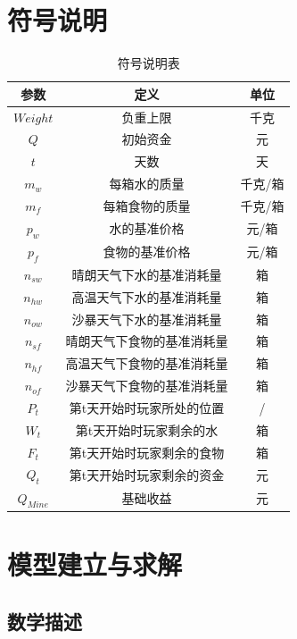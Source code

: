 \documentclass[withoutpreface,bwprint]{cumcmthesis} %
\begin{document}
\section{符号说明}
\begin{table}[H]
    \caption{符号说明表}\label{tab:001} \centering
    \begin{tabular}{ccc}
        \toprule[1.5pt]
        \textbf{参数} & \textbf{定义} & \textbf{单位}\\
        \midrule[1pt]
        $Weight$ & 负重上限 & 千克\\ 
        $Q$ & 初始资金 & 元 \\
        $t$ & 天数 & 天\\
        $m_w$ & 每箱水的质量 & 千克/箱\\
        $m_f$ & 每箱食物的质量 & 千克/箱 \\
        $p_w$ & 水的基准价格 & 元/箱\\
        $p_f$ & 食物的基准价格 & 元/箱\\
        $n_{sw}$ & 晴朗天气下水的基准消耗量 & 箱\\
        $n_{hw}$ & 高温天气下水的基准消耗量 & 箱\\
        $n_{ow}$ & 沙暴天气下水的基准消耗量 & 箱\\
        $n_{sf}$ & 晴朗天气下食物的基准消耗量 & 箱\\
        $n_{hf}$ & 高温天气下食物的基准消耗量 & 箱\\
        $n_{of}$ & 沙暴天气下食物的基准消耗量 & 箱\\
        $P_{t}$ & 第t天开始时玩家所处的位置 & / \\
        $W_{t}$ & 第t天开始时玩家剩余的水 & 箱 \\
        $F_{t}$ & 第t天开始时玩家剩余的食物 & 箱 \\ 
        $Q_{t}$ & 第t天开始时玩家剩余的资金 & 元 \\
        $Q_{Mine}$ & 基础收益 & 元\\
        
        \bottomrule[1.5pt]
    \end{tabular}
\end{table}


\section{模型建立与求解}
\subsection{数学描述}
\end{document}
